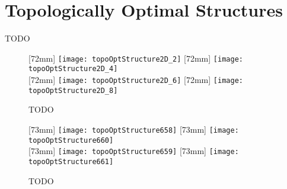 \chapter{Topologically Optimal Structures}
\label{chap:a30structures}

TODO

\begin{figure}
  [72mm]{%
    \texttt{[image: topoOptStructure2D\_2]}%
  }%
  \hfill%
  [72mm]{%
    \texttt{[image: topoOptStructure2D\_4]}%
  }%
  \\[2mm]%
  [72mm]{%
    \texttt{[image: topoOptStructure2D\_6]}%
  }%
  \hfill%
  [72mm]{%
    \texttt{[image: topoOptStructure2D\_8]}%
  }%
  \caption[TODO]{%
    TODO%
  }%
  \label{fig:topoOptStructure2DL}%
\end{figure}

\begin{figure}
  [73mm]{%
    \texttt{[image: topoOptStructure658]}%
  }%
  \hfill%
  [73mm]{%
    \texttt{[image: topoOptStructure660]}%
  }%
  \\[2mm]%
  [73mm]{%
    \texttt{[image: topoOptStructure659]}%
  }%
  \hfill%
  [73mm]{%
    \texttt{[image: topoOptStructure661]}%
  }%
  \caption[TODO]{%
    TODO%
  }%
  \label{fig:topoOptStructure3D}%
\end{figure}

\cleardoublepage
